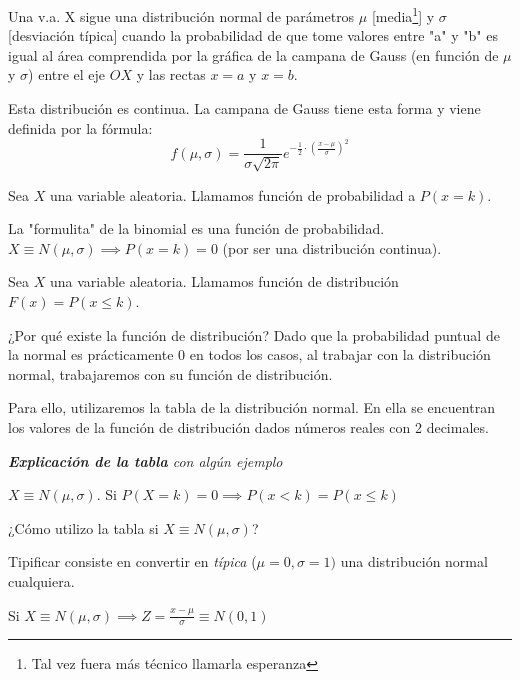
\begin{defn}
Una v.a. X sigue una distribución normal de parámetros $\mu$ [media\footnote{Tal vez fuera más técnico llamarla esperanza}] y $\sigma$ [desviación típica] cuando la probabilidad de que tome valores entre "a" y "b" es igual al área comprendida por la gráfica de la campana de Gauss (en función de $\mu$ y $\sigma$) entre el eje $OX$ y las rectas $x=a$ y $x=b$.
\end{defn}

\obs Esta distribución es continua.
\obs La campana de Gauss tiene esta forma y viene definida por la fórmula: \[f(\mu,\sigma) = \displaystyle\frac{1}{\sigma\sqrt{2\pi}}e^{\displaystyle-\frac{1}{2}·\left(\frac{x-\mu}{\sigma}\right)^2}\]

\begin{defn}
Sea $X$ una variable aleatoria. Llamamos función de probabilidad a $P(x=k)$.
\end{defn}
\obs La "formulita" de la binomial es una función de probabilidad.
\obs $X\equiv N(\mu,\sigma) \implies P(x=k) = 0$ (por ser una distribución continua).

\begin{defn}
Sea $X$ una variable aleatoria. Llamamos función de distribución $F(x) = P(x\leq k)$.
\end{defn}

\obs ¿Por qué existe la función de distribución?
%
Dado que la probabilidad puntual de la normal es prácticamente 0 en todos los casos, al trabajar con la distribución normal, trabajaremos con su función de distribución.

Para ello, utilizaremos la tabla de la distribución normal. En ella se encuentran los valores de la función de distribución dados números reales con 2 decimales.

\textit{\textbf{Explicación de la tabla} con algún ejemplo}

\obs $X\equiv N(\mu,\sigma)$. Si $P(X=k) = 0 \implies P(x<k) = P(x\leq k)$

\obs ¿Cómo utilizo la tabla si $X\equiv N(\mu,\sigma)$? 

\begin{defn}[Tipificación]
Tipificar consiste en convertir en \textit{típica} ($\mu=0,\sigma=1)$ una distribución normal cualquiera.

Si $X\equiv N(\mu,\sigma) \implies Z = \displaystyle\frac{x-\mu}{\sigma} \equiv N(0,1)$
\end{defn}

